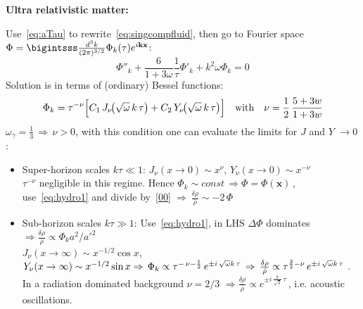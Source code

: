 \begin{mycolorbox}
    \textbf{Ultra relativistic matter:} 
    
    Use~\eqref{eq:aTau} to rewrite~\eqref{eq:singcompfluid}, then go to Fourier space $\Phi = \bigintsss \frac{d^3k}{(2\pi)^{3/2}} \Phi_k(\tau) e^{i\mathbf{k}\mathbf{x}}$:
    \begin{equation}
        \Phi''_k + \frac{6}{1+3\omega}\frac{1}{\tau} \Phi'_k + k^2 \omega \Phi_k = 0
    \end{equation}
    Solution is in terms of (ordinary) Bessel functions:
    \begin{equation}
        \Phi_{k} = \tau^{-\nu}
               \Bigl[
                  C_{1}\,J_{\nu}\!\bigl(\sqrt{\omega}\,k\,\tau\bigr)
                + C_{2}\,Y_{\nu}\!\bigl(\sqrt{\omega}\,k\,\tau\bigr)
               \Bigr] \quad  \text{with}\quad \nu = \frac{1}{2}\,\frac{5 + 3w}{1 + 3w}
    \end{equation}
    $\omega_\gamma = \frac{1}{3} \,\Rightarrow\, \nu>0$, with this condition one can evaluate the limits for $J$ and $Y$ $\rightarrow 0$:
    \begin{itemize}
        \item Super-horizon scales $k \tau \ll1$: $J_{\nu}(x\rightarrow0)\sim x^\nu$, $Y_{\nu}(x\rightarrow0)\sim x^{-\nu}$ \\ $\tau^{-\nu}$ negligible in this regime. Hence $\Phi_k \sim const \,\Rightarrow \Phi = \Phi(\mathbf{x})\,$, use~\eqref{eq:hydro1} and divide by~\eqref{00} $\Rightarrow \, \frac{\delta \rho}{\bar{\rho}} \sim -2\,\Phi$
        \item Sub-horizon scales  $k \tau \gg1$:  Use~\eqref{eq:hydro1}, in LHS $\Delta \Phi$ dominates $\Rightarrow \frac{\delta\rho}{\rho} \propto \Phi_k a^2/a'^2$\\
        $J_{\nu}(x\rightarrow \infty)\sim x^{-1/2}\cos{x}$, $Y_{\nu}(x\rightarrow \infty)\sim x^{-1/2}\sin{x} \\\Rightarrow\,\Phi_{k} \propto \tau^{-\,\nu-\frac{1}{2}}\,
        e^{\pm i\,\sqrt{\omega} k\,\tau} \,\Rightarrow\, \frac{\delta \rho}{\bar{\rho}} \propto \tau^{\frac{3}{2}-\nu}\, e^{\pm i\,\sqrt{\omega} k\,\tau}$ . In a radiation dominated background $\nu = 2/3$ $\Rightarrow \frac{\delta\rho}{\bar{\rho}} \propto e^{\pm i\,\frac{k}{\sqrt{3}}\,\tau} \,$, i.e. acoustic oscillations.
    \end{itemize}
\end{mycolorbox}

